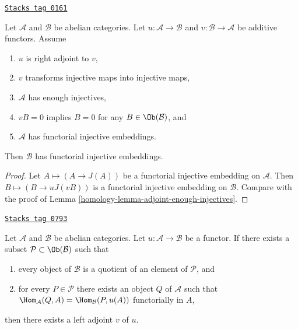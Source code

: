 \begin{lemma}
\label{homology-lemma-adjoint-functorial-injectives}
\href{https://stacks.math.columbia.edu/tag/0161}{\texttt{Stacks tag 0161}}

Let $\mathcal{A}$ and $\mathcal{B}$ be abelian categories.
Let $u : \mathcal{A} \to \mathcal{B}$ and
$v : \mathcal{B} \to \mathcal{A}$ be additive functors.
Assume
\begin{enumerate}
\item $u$ is right adjoint to $v$,
\item $v$ transforms injective maps into injective maps,
\item $\mathcal{A}$ has enough injectives,
\item $vB = 0$ implies $B = 0$ for any $B \in \Ob(\mathcal{B})$, and
\item $\mathcal{A}$ has functorial injective embeddings.
\end{enumerate}
Then $\mathcal{B}$ has functorial injective embeddings.
\end{lemma}

\begin{proof}

Let $A \mapsto (A \to J(A))$ be a functorial
injective embedding on $\mathcal{A}$. Then
$B \mapsto (B \to uJ(vB))$ is a functorial
injective embedding on $\mathcal{B}$. Compare with the
proof of Lemma \ref{homology-lemma-adjoint-enough-injectives}.
\end{proof}

\begin{lemma}
\label{homology-lemma-partially-defined-adjoint}
\href{https://stacks.math.columbia.edu/tag/0793}{\texttt{Stacks tag 0793}}

Let $\mathcal{A}$ and $\mathcal{B}$ be abelian categories.
Let $u : \mathcal{A} \to \mathcal{B}$ be a functor.
If there exists a subset $\mathcal{P} \subset \Ob(\mathcal{B})$
such that
\begin{enumerate}
\item every object of $\mathcal{B}$ is a quotient of an element
of $\mathcal{P}$, and
\item for every $P \in \mathcal{P}$ there exists an object
$Q$ of $\mathcal{A}$ such that
$\Hom_\mathcal{A}(Q, A) = \Hom_\mathcal{B}(P, u(A))$ functorially
in $A$,
\end{enumerate}
then there exists a left adjoint $v$ of $u$.
\end{lemma}

